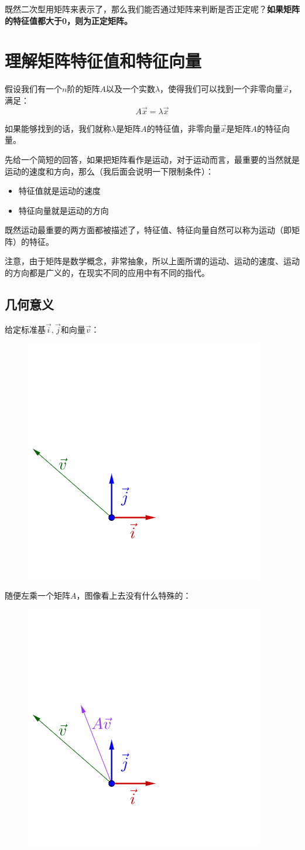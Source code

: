 \documentclass[12pt]{article}
\begin{document}
既然二次型用矩阵来表示了，那么我们能否通过矩阵来判断是否正定呢？\textbf{如果矩阵的特征值都大于0，则为正定矩阵。}

\section{理解矩阵特征值和特征向量\cite{How_To_Understand_Eigen_Value_Vector}}
假设我们有一个$n$阶的矩阵$A$以及一个实数$\lambda$，使得我们可以找到一个非零向量$\vec{x}$，满足：
$$
A\vec{x} = \lambda\vec{x}
$$

如果能够找到的话，我们就称$\lambda$是矩阵$A$的特征值，非零向量$\vec{x}$是矩阵$A$的特征向量。

先给一个简短的回答，如果把矩阵看作是运动，对于运动而言，最重要的当然就是运动的速度和方向，那么（我后面会说明一下限制条件）：
\begin{itemize}
    \item 特征值就是运动的速度
    \item 特征向量就是运动的方向
\end{itemize}

既然运动最重要的两方面都被描述了，特征值、特征向量自然可以称为运动（即矩阵）的特征。

注意，由于矩阵是数学概念，非常抽象，所以上面所谓的运动、运动的速度、运动的方向都是广义的，在现实不同的应用中有不同的指代。

\subsection{几何意义}
给定标准基$\vec{i},\vec{j}$和向量$\vec{v}$：
\begin{figure}[H]
    \centering
    \includegraphics[width=.3\textwidth]{fig/UnderstandEigenValueVector_1.png}
\end{figure} 

随便左乘一个矩阵$A$，图像看上去没有什么特殊的：
\begin{figure}[H]
    \centering
    \includegraphics[width=.3\textwidth]{fig/UnderstandEigenValueVector_2.png}
\end{figure} 
\end{document}
